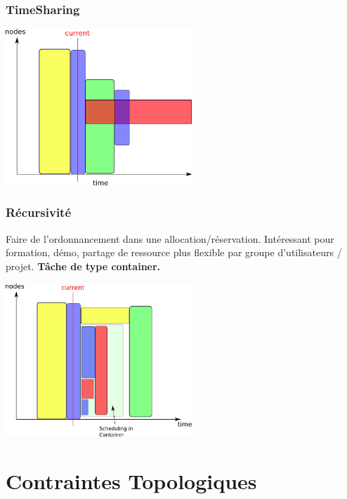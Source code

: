 \documentclass{beamer}
\begin{document}
\begin{frame}
  \frametitle{TimeSharing} 
  \begin{center}
			\includegraphics[width=7cm]{timesharing.png}
	\end{center}
\end{frame}

\begin{frame}
  \frametitle{Récursivité}
  Faire de l'ordonnancement dans une allocation/réservation. Intéressant pour formation, démo, partage de ressource plus flexible  par groupe d'utilisateurs / projet. {\bf Tâche de type container.} 
  \begin{center}
			\includegraphics[width=7cm]{recursivity.png}
	\end{center}

\end{frame}

\section{Contraintes Topologiques}
\end{document}
